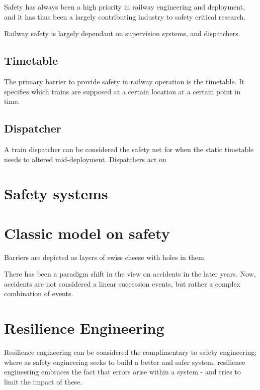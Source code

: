 Safety has always been a high priority in railway engineering and deployment, and it has thus been a largely contributing industry to safety critical research.

Railway safety is largely dependant on supervision systems, and dispatchers.

\subsection{Timetable}
The primary barrier to provide safety in railway operation is the timetable. It specifies which trains are supposed at a certain location at a certain point in time.

\subsection{Dispatcher}
A train dispatcher can be considered the safety net for when the static timetable needs to altered mid-deployment.
Dispatchers act on



\cite{belmonte2008dispatcher}


\section{Safety systems}

\section{Classic model on safety}
Barriers are depicted as layers of swiss cheese with holes in them. 


There has been a paradigm shift in the view on accidents in the later years. Now, accidents are not considered a linear succession events, but rather a complex combination of events.



\section{Resilience Engineering}
\label{sec:resilience_engineering}
Resilience engineering can be considered the complimentary to safety engineering; where as safety engineering seeks to build a better and safer system, resilience engineering embraces the fact that errors arise within a system - and tries to limit the impact of these.

